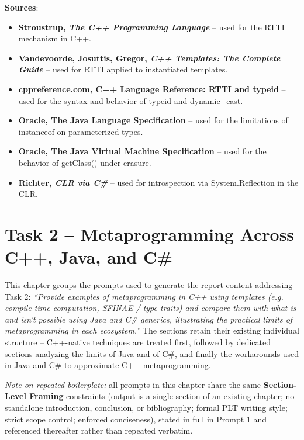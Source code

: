 \documentclass[11pt]{report}
\begin{document}
\vspace{0.5em}
\noindent\textbf{Sources}:
\begin{itemize}
    \item \textbf{Stroustrup, \emph{The C++ Programming Language}} \cite{stroustrup2013} -- used for the RTTI mechanism in C++.
    \item \textbf{Vandevoorde, Josuttis, Gregor, \emph{C++ Templates: The Complete Guide}} \cite{cpp_templates2017} -- used for RTTI applied to instantiated templates.
    \item \textbf{cppreference.com, C++ Language Reference: RTTI and typeid} \cite{cppreference} -- used for the syntax and behavior of typeid and dynamic\_cast.
    \item \textbf{Oracle, The Java Language Specification} \cite{jls2024} -- used for the limitations of instanceof on parameterized types.
    \item \textbf{Oracle, The Java Virtual Machine Specification} \cite{jvms2024} -- used for the behavior of getClass() under erasure.
    \item \textbf{Richter, \emph{CLR via C\#}} \cite{richter2012} -- used for introspection via System.Reflection in the CLR.
\end{itemize}

\chapter{Task 2 -- Metaprogramming Across C++, Java, and C\#}

This chapter groups the prompts used to generate the report content
addressing Task 2: \textit{``Provide examples of metaprogramming in C++
using templates (e.g. compile-time computation, SFINAE / type traits) and
compare them with what is and isn't possible using Java and C\# generics,
illustrating the practical limits of metaprogramming in each ecosystem.''}
The sections retain their existing individual structure -- C++-native
techniques are treated first, followed by dedicated sections analyzing the
limits of Java and of C\#, and finally the workarounds used in Java and C\#
to approximate C++ metaprogramming.

\noindent\textit{Note on repeated boilerplate:} all prompts in this chapter
share the same \textbf{Section-Level Framing} constraints (output is a single
section of an existing chapter; no standalone introduction, conclusion, or
bibliography; formal PLT writing style; strict scope control; enforced
conciseness), stated in full in Prompt 1 and referenced thereafter rather than
repeated verbatim.
\end{document}
